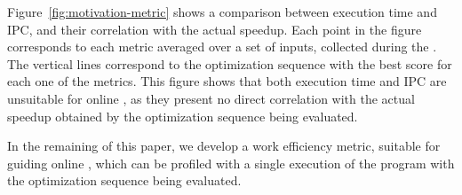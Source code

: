 Figure~\ref{fig:motivation-metric} shows a comparison between execution time and IPC,
and their correlation with the actual speedup.
Each point in the figure corresponds to each metric averaged over
a set of inputs, collected during the {\itercomp}.
The vertical lines correspond to the optimization sequence
with the best score for each one of the metrics.
This figure shows that both execution time and IPC are unsuitable for
online {\itercomp}, as they present no direct correlation with the actual
speedup obtained by the optimization sequence being evaluated.

In the remaining of this paper, we develop a work efficiency metric, suitable
for guiding online {\itercomp}, which can be profiled with a single execution
of the program with the optimization sequence being evaluated.
